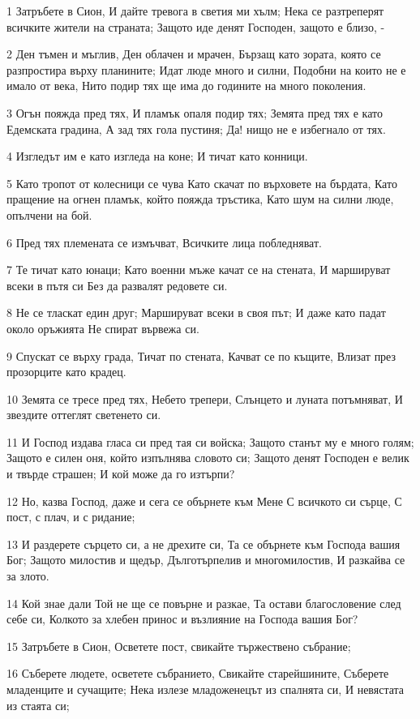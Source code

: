 \par 1 Затръбете в Сион, И дайте тревога в светия ми хълм; Нека се разтреперят всичките жители на страната; Защото иде денят Господен, защото е близо, -
\par 2 Ден тъмен и мъглив, Ден облачен и мрачен, Бързащ като зората, която се разпростира върху планините; Идат люде много и силни, Подобни на които не е имало от века, Нито подир тях ще има до годините на много поколения.
\par 3 Огън пояжда пред тях, И пламък опаля подир тях; Земята пред тях е като Едемската градина, А зад тях гола пустиня; Да! нищо не е избегнало от тях.
\par 4 Изгледът им е като изгледа на коне; И тичат като конници.
\par 5 Като тропот от колесници се чува Като скачат по върховете на бърдата, Като пращение на огнен пламък, който пояжда тръстика, Като шум на силни люде, опълчени на бой.
\par 6 Пред тях племената се измъчват, Всичките лица побледняват.
\par 7 Те тичат като юнаци; Като военни мъже качат се на стената, И маршируват всеки в пътя си Без да развалят редовете си.
\par 8 Не се тласкат един друг; Маршируват всеки в своя път; И даже като падат около оръжията Не спират вървежа си.
\par 9 Спускат се върху града, Тичат по стената, Качват се по къщите, Влизат през прозорците като крадец.
\par 10 Земята се тресе пред тях, Небето трепери, Слънцето и луната потъмняват, И звездите оттеглят светенето си.
\par 11 И Господ издава гласа си пред тая си войска; Защото станът му е много голям; Защото е силен оня, който изпълнява словото си; Защото денят Господен е велик и твърде страшен; И кой може да го изтърпи?
\par 12 Но, казва Господ, даже и сега се обърнете към Мене С всичкото си сърце, С пост, с плач, и с ридание;
\par 13 И раздерете сърцето си, а не дрехите си, Та се обърнете към Господа вашия Бог; Защото милостив и щедър, Дълготърпелив и многомилостив, И разкайва се за злото.
\par 14 Кой знае дали Той не ще се повърне и разкае, Та остави благословение след себе си, Колкото за хлебен принос и възлияние на Господа вашия Бог?
\par 15 Затръбете в Сион, Осветете пост, свикайте тържествено събрание;
\par 16 Съберете людете, осветете събранието, Свикайте старейшините, Съберете младенците и сучащите; Нека излезе младоженецът из спалнята си, И невястата из стаята си;
